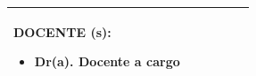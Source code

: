 \documentclass[10pt]{article}   %
\newcommand{\itemTeacher}{Dr(a). Docente a cargo}
\begin{document}
\begin{table}[h!]
\begin{tabular}{|m{2.4cm}|m{2.1cm}|m{2.4cm}|m{2cm}|m{2.64cm}|m{2.42cm}|}
{\begin{minipage}{8cm}
                \vspace{0.5em} %
                DOCENTE (s):
                \begin{itemize}
                    \setlength{\itemsep}{0pt}
                    \setlength{\parskip}{0pt}
                    \setlength{\parsep}{0pt}
                    \item \itemTeacher
                \end{itemize}
                \vspace{0em} %
            \end{minipage}}\\ \hline 	
        \end{tabular}
    \end{table}
    \normalsize
    
    
\end{document}
